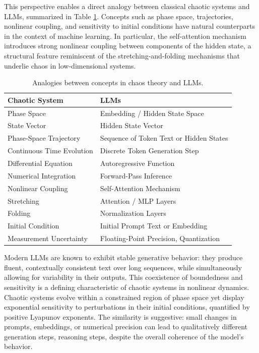 \documentclass[aip%
 aip,
 amsmath,amssymb,
 reprint,%
]{revtex4-1}
\begin{document}
This perspective enables a direct analogy between classical chaotic systems and LLMs, summarized in Table \ref{tab:analogy}. Concepts such as phase space, trajectories, nonlinear coupling, and sensitivity to initial conditions have natural counterparts in the context of machine learning. In particular, the self-attention mechanism introduces strong nonlinear coupling between components of the hidden state, a structural feature reminiscent of the stretching-and-folding mechanisms that underlie chaos in low-dimensional systems.

\begin{table}[H]
\centering
\begin{tabular}{@{}ll@{}}
\toprule
\textbf{Chaotic System} & \textbf{LLMs} \\ \midrule
Phase Space & Embedding / Hidden State Space \\
State Vector & Hidden State Vector \\
Phase-Space Trajectory & Sequence of Token Text or Hidden States \\
Continuous Time Evolution & Discrete Token Generation Step \\
Differential Equation & Autoregressive Function \\
Numerical Integration & Forward-Pass Inference \\
Nonlinear Coupling & Self-Attention Mechanism \\
Stretching & Attention / MLP Layers \\
Folding & Normalization Layers \\
Initial Condition & Initial Prompt Text or Embedding \\
Measurement Uncertainty & Floating-Point Precision, Quantization \\ \bottomrule
\end{tabular}
\caption{Analogies between concepts in chaos theory and LLMs.}
\label{tab:analogy}
\end{table}

Modern LLMs are known to exhibit stable generative behavior: they produce fluent, contextually consistent text over long sequences, while simultaneously allowing for variability in their outputs. This coexistence of boundedness and sensitivity is a defining characteristic of chaotic systems in nonlinear dynamics. Chaotic systems evolve within a constrained region of phase space yet display exponential sensitivity to perturbations in their initial conditions, quantified by positive Lyapunov exponents. The similarity is suggestive: small changes in prompts, embeddings, or numerical precision can lead to qualitatively different generation steps, reasoning steps, despite the overall coherence of the model’s behavior.
\end{document}
